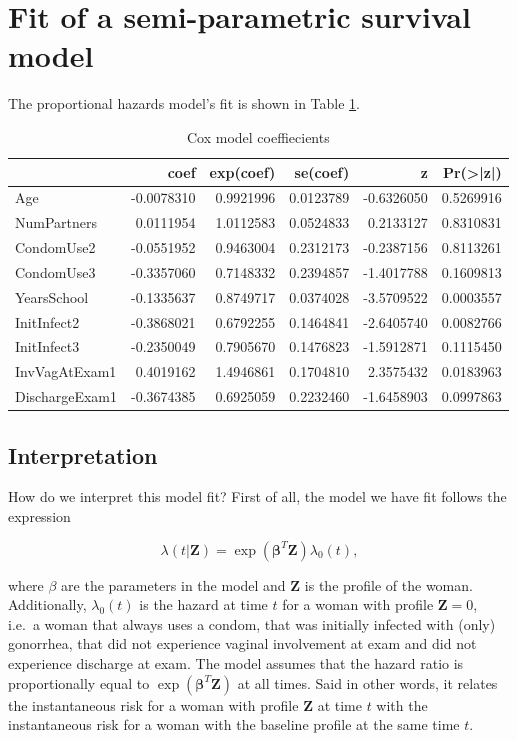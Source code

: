 \documentclass[
]{article}
\begin{document}
\hypertarget{fit-of-a-semi-parametric-survival-model}{%
\section{Fit of a semi-parametric survival model}\label{fit-of-a-semi-parametric-survival-model}}

The proportional hazards model's fit is shown in Table \ref{tab:Cox-model}.

\begin{table}

\caption{\label{tab:Cox-model}Cox model coeffiecients}
\centering
\begin{tabular}[t]{l|r|r|r|r|r}
\hline
  & coef & exp(coef) & se(coef) & z & Pr(>|z|)\\
\hline
Age & -0.0078310 & 0.9921996 & 0.0123789 & -0.6326050 & 0.5269916\\
\hline
NumPartners & 0.0111954 & 1.0112583 & 0.0524833 & 0.2133127 & 0.8310831\\
\hline
CondomUse2 & -0.0551952 & 0.9463004 & 0.2312173 & -0.2387156 & 0.8113261\\
\hline
CondomUse3 & -0.3357060 & 0.7148332 & 0.2394857 & -1.4017788 & 0.1609813\\
\hline
YearsSchool & -0.1335637 & 0.8749717 & 0.0374028 & -3.5709522 & 0.0003557\\
\hline
InitInfect2 & -0.3868021 & 0.6792255 & 0.1464841 & -2.6405740 & 0.0082766\\
\hline
InitInfect3 & -0.2350049 & 0.7905670 & 0.1476823 & -1.5912871 & 0.1115450\\
\hline
InvVagAtExam1 & 0.4019162 & 1.4946861 & 0.1704810 & 2.3575432 & 0.0183963\\
\hline
DischargeExam1 & -0.3674385 & 0.6925059 & 0.2232460 & -1.6458903 & 0.0997863\\
\hline
\end{tabular}
\end{table}

\hypertarget{interpretation-1}{%
\subsection{Interpretation}\label{interpretation-1}}

How do we interpret this model fit? First of all, the model we have fit follows the expression

\[
\lambda(t|\mathbf{Z}) =  \exp(\mathbf{\beta}^T\mathbf{Z})\lambda_0(t),  
\]

where \(\beta\) are the parameters in the model and \(\mathbf{Z}\) is the profile of the woman. Additionally, \(\lambda_0(t)\) is the hazard at time \(t\) for a woman with profile \(\mathbf{Z} = 0\), i.e.~a woman that always uses a condom, that was initially infected with (only) gonorrhea, that did not experience vaginal involvement at exam and did not experience discharge at exam. The model assumes that the hazard ratio is proportionally equal to \(\exp(\mathbf{\beta}^T\mathbf{Z})\) at all times. Said in other words, it relates the instantaneous risk for a woman with profile \(\mathbf{Z}\) at time \(t\) with the instantaneous risk for a woman with the baseline profile at the same time \(t\).
\end{document}
